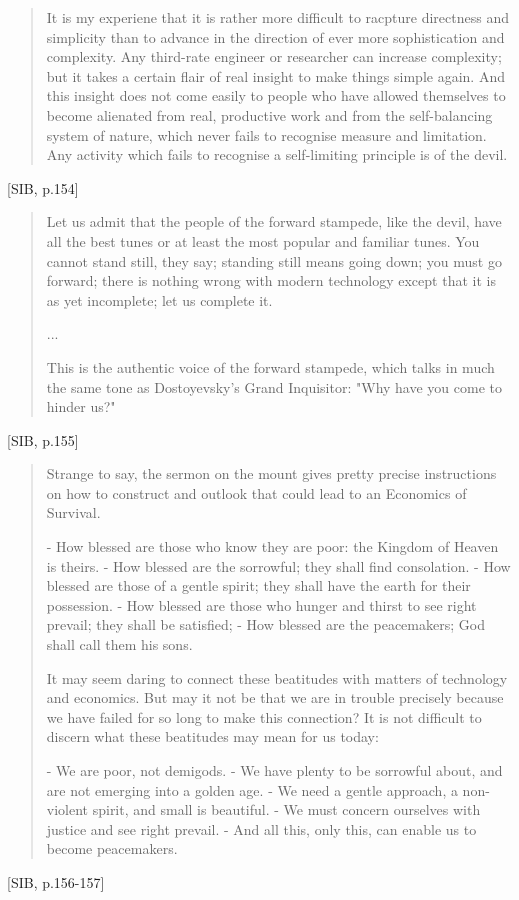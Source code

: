 \begin{quote}
  It is my experiene that it is rather more difficult to racpture directness and simplicity than to advance in the direction of ever more sophistication and complexity. Any third-rate engineer or researcher can increase complexity; but it takes a certain flair of real insight to make things simple again. And this insight does not come easily to people who have allowed themselves to become alienated from real, productive work and from the self-balancing system of nature, which never fails to recognise measure and limitation. Any activity which fails to recognise a self-limiting principle is of the devil.
\end{quote}[SIB, p.154]

\begin{quote}
  Let us admit that the people of the forward stampede, like the devil, have all the best tunes or at least the most popular and familiar tunes. You cannot stand still, they say; standing still means going down; you must go forward; there is nothing wrong with modern technology except that it is as yet incomplete; let us complete it.

  ...

  This is the authentic voice of the forward stampede, which talks in much the same tone as Dostoyevsky's Grand Inquisitor: "Why  have you come to hinder us?"
\end{quote}[SIB, p.155]

\begin{quote}
  Strange to say, the sermon on the mount gives pretty precise instructions on how to construct and outlook that could lead to an Economics of Survival.

  - How blessed are those who know they are poor: the Kingdom of Heaven is theirs.
  - How blessed are the sorrowful; they shall find consolation.
  - How blessed are those of a gentle spirit; they shall have the earth for their possession.
  - How blessed are those who hunger and thirst to see right prevail; they shall be satisfied;
  - How blessed are the peacemakers; God shall call them his sons.

  It may seem daring to connect these beatitudes with matters of technology and economics. But may it not be that we are in trouble precisely because we have failed for so long to make this connection? It is not difficult to discern what these beatitudes may mean for us today:

  - We are poor, not demigods.
  - We have plenty to be sorrowful about, and are not emerging into a golden age.
  - We need a gentle approach, a non-violent spirit, and small is beautiful.
  - We must concern ourselves with justice and see right prevail.
  - And all this, only this, can enable us to become peacemakers.
\end{quote}[SIB, p.156-157]

